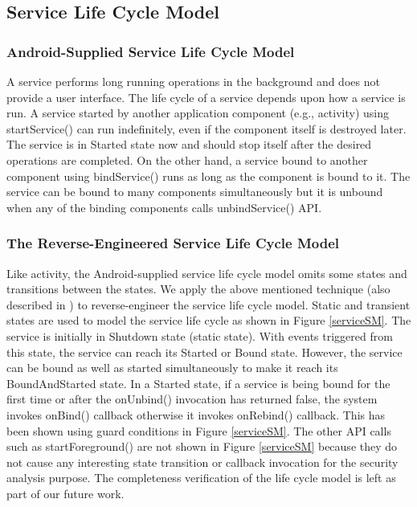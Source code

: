 \documentclass[10pt]{elsarticle}
\begin{document}
\subsection{Service Life Cycle Model} \label{serviceLCM}

\subsubsection{Android-Supplied Service Life Cycle Model}

A service performs long running operations in the background and does not provide a user interface. The life cycle of a service \cite{service} depends upon how a service is run. A service started by another application component (e.g., activity) using {\ttfamily startService()} can run indefinitely, even if the component itself is destroyed later. The service is in Started state now and should stop itself after the desired operations are completed. On the other hand, a service bound to another component using {\ttfamily bindService()} runs as long as the component is bound to it. The service can be bound to many components simultaneously but it is unbound when any of the binding components calls {\ttfamily unbindService()} API. 

\subsubsection{The Reverse-Engineered Service Life Cycle Model}

Like activity, the Android-supplied service life cycle model omits some states and transitions between the states. We apply the above mentioned technique (also described in \cite{serviceLCMFrank}) to reverse-engineer the service life cycle model. Static and transient states are used to model the service life cycle as shown in Figure \ref{serviceSM}. The service is initially in Shutdown state (static state). With events triggered from this state, the service can reach its Started or Bound state. However, the service can be bound as well as started simultaneously to make it reach its BoundAndStarted state. In a Started state, if a service is being bound for the first time or after the {\ttfamily onUnbind()} invocation has returned false, the system invokes {\ttfamily onBind()} callback otherwise it invokes {\ttfamily onRebind()} callback. This has been shown using guard conditions in Figure \ref{serviceSM}. The other API calls such as {\ttfamily startForeground()} are not shown in Figure \ref{serviceSM} because they do not cause any interesting state transition or callback invocation for the security analysis purpose. The completeness verification of the life cycle model is left as part of our future work.
\end{document}
